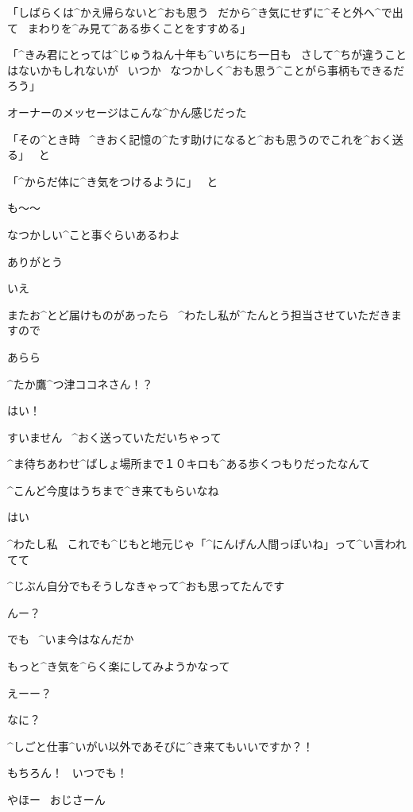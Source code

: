 \page[13]
\Hatsuseno 「しばらくは^{かえ}{帰}らないと^{おも}{思}う
\ だから^{き}{気}にせずに^{そと}{外}へ^{で}{出}て
\ まわりを^{み}{見}て^{ある}{歩}くことをすすめる」

\Hatsuseno 「^{きみ}{君}にとっては^{じゅうねん}{十年}も^{いちにち}{一日}も
\ さして^{ちが}{違}うことはないかもしれないが
\ いつか
\ なつかしく^{おも}{思}う^{ことがら}{事柄}もできるだろう」

\Alpha オーナーのメッセージはこんな^{かん}{感}じだった

\page[14]
\Hatsuseno 「その^{とき}{時}
\ ^{きおく}{記憶}の^{たす}{助}けになると^{おも}{思}うのでこれを^{おく}{送}る」
\ と

\Hatsuseno 「^{からだ}{体}に^{き}{気}をつけるように」
\ と

\Alpha も〜〜

\Alpha なつかしい^{こと}{事}ぐらいあるわよ

\page[15]
\Alpha ありがとう

\Kokone いえ

\Kokone またお^{とど}{届}けものがあったら
\ ^{わたし}{私}が^{たんとう}{担当}させていただきますので

\Alpha あらら

\Alpha ^{たか}{鷹}^{つ}{津}ココネさん！？

\Kokone はい！

\page[16]
\Kokone すいません
\ ^{おく}{送}っていただいちゃって

\Alpha ^{ま}{待}ちあわせ^{ばしょ}{場所}まで１０キロも^{ある}{歩}くつもりだったなんて

\Alpha ^{こんど}{今度}はうちまで^{き}{来}てもらいなね

\Kokone はい

\page[17]
\Kokone ^{わたし}{私}
\ これでも^{じもと}{地元}じゃ「^{にんげん}{人間}っぽいね」って^{い}{言}われてて

\Kokone ^{じぶん}{自分}でもそうしなきゃって^{おも}{思}ってたんです

\Alpha んー？

\Kokone でも
\ ^{いま}{今}はなんだか

\Kokone もっと^{き}{気}を^{らく}{楽}にしてみようかなって

\Alpha えーー？

\Alpha なに？

\page[18]
\Kokone ^{しごと}{仕事}^{いがい}{以外}であそびに^{き}{来}てもいいですか？！

\Alpha もちろん！
\ いつでも！

\Alpha やほー
\ おじさーん


